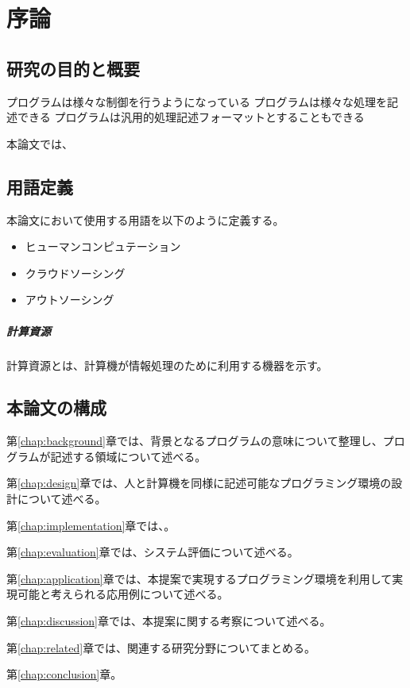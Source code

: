 \chapter{序論}\label{chap:introduction}

\section{研究の目的と概要}\label{ux7814ux7a76ux306eux76eeux7684ux3068ux6982ux8981}

プログラムは様々な制御を行うようになっている
プログラムは様々な処理を記述できる
プログラムは汎用的処理記述フォーマットとすることもできる

本論文では、

\section{用語定義}\label{ux7528ux8a9eux5b9aux7fa9}

本論文において使用する用語を以下のように定義する。

\begin{itemize}
\itemsep1pt\parskip0pt
\item
  ヒューマンコンピュテーション
\item
  クラウドソーシング
\item
  アウトソーシング
\end{itemize}

\paragraph{計算資源}\label{ux8a08ux7b97ux8cc7ux6e90}

計算資源とは、計算機が情報処理のために利用する機器を示す。

\section{本論文の構成}\label{ux672cux8ad6ux6587ux306eux69cbux6210}

第\ref{chap:background}章では、背景となるプログラムの意味について整理し、プログラムが記述する領域について述べる。

第\ref{chap:design}章では、人と計算機を同様に記述可能なプログラミング環境の設計について述べる。

第\ref{chap:implementation}章では、。

第\ref{chap:evaluation}章では、システム評価について述べる。

第\ref{chap:application}章では、本提案で実現するプログラミング環境を利用して実現可能と考えられる応用例について述べる。

第\ref{chap:discussion}章では、本提案に関する考察について述べる。

第\ref{chap:related}章では、関連する研究分野についてまとめる。

第\ref{chap:conclusion}章。
